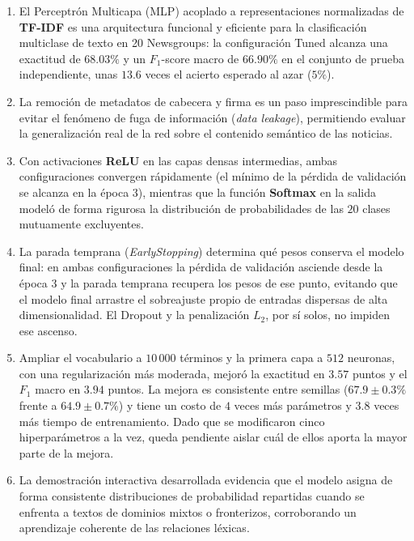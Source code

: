 \documentclass[12pt, a4paper]{article}
\begin{document}
\begin{enumerate}
    \item El Perceptrón Multicapa (MLP) acoplado a representaciones normalizadas de \textbf{TF-IDF} es una arquitectura funcional y eficiente para la clasificación multiclase de texto en 20 Newsgroups: la configuración Tuned alcanza una exactitud de $68.03\%$ y un $F_1$-score macro de $66.90\%$ en el conjunto de prueba independiente, unas $13.6$ veces el acierto esperado al azar ($5\%$).
    \item La remoción de metadatos de cabecera y firma es un paso imprescindible para evitar el fenómeno de fuga de información (\textit{data leakage}), permitiendo evaluar la generalización real de la red sobre el contenido semántico de las noticias.
    \item Con activaciones \textbf{ReLU} en las capas densas intermedias, ambas configuraciones convergen rápidamente (el mínimo de la pérdida de validación se alcanza en la época $3$), mientras que la función \textbf{Softmax} en la salida modeló de forma rigurosa la distribución de probabilidades de las $20$ clases mutuamente excluyentes.
    \item La parada temprana (\textit{EarlyStopping}) determina qué pesos conserva el modelo final: en ambas configuraciones la pérdida de validación asciende desde la época $3$ y la parada temprana recupera los pesos de ese punto, evitando que el modelo final arrastre el sobreajuste propio de entradas dispersas de alta dimensionalidad. El Dropout y la penalización $L_2$, por sí solos, no impiden ese ascenso.
    \item Ampliar el vocabulario a $10\,000$ términos y la primera capa a $512$ neuronas, con una regularización más moderada, mejoró la exactitud en $3.57$ puntos y el $F_1$ macro en $3.94$ puntos. La mejora es consistente entre semillas ($67.9 \pm 0.3\%$ frente a $64.9 \pm 0.7\%$) y tiene un costo de $4$ veces más parámetros y $3.8$ veces más tiempo de entrenamiento. Dado que se modificaron cinco hiperparámetros a la vez, queda pendiente aislar cuál de ellos aporta la mayor parte de la mejora.
    \item La demostración interactiva desarrollada evidencia que el modelo asigna de forma consistente distribuciones de probabilidad repartidas cuando se enfrenta a textos de dominios mixtos o fronterizos, corroborando un aprendizaje coherente de las relaciones léxicas.
\end{enumerate}
\end{document}
